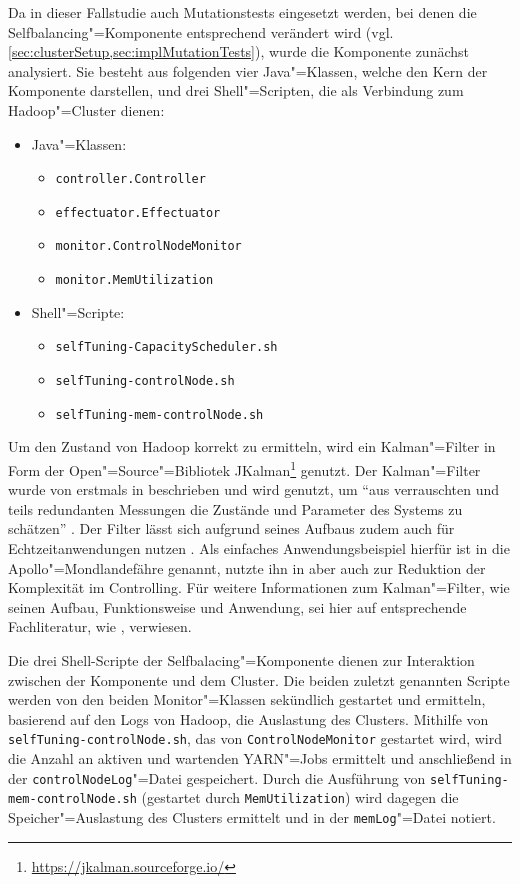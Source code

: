 Da in dieser Fallstudie auch Mutationstests eingesetzt werden, bei denen die Selfbalancing"=Komponente entsprechend verändert wird (vgl. \cref{sec:clusterSetup,sec:implMutationTests}), wurde die Komponente zunächst analysiert.
Sie besteht aus folgenden vier Java"=Klassen, welche den Kern der Komponente darstellen, und drei Shell"=Scripten, die als Verbindung zum Hadoop"=Cluster dienen:

\begin{itemize}
    \item Java"=Klassen:
    \begin{itemize}
        \item \texttt{controller.Controller}
        \item \texttt{effectuator.Effectuator}
        \item \texttt{monitor.ControlNodeMonitor}
        \item \texttt{monitor.MemUtilization}
    \end{itemize}
    \item Shell"=Scripte:
    \begin{itemize}
        \item \texttt{selfTuning-CapacityScheduler.sh}
        \item \texttt{selfTuning-controlNode.sh}
        \item \texttt{selfTuning-mem-controlNode.sh}
    \end{itemize}
\end{itemize}

Um den Zustand von Hadoop korrekt zu ermitteln, wird ein Kalman"=Filter in Form der Open"=Source"=Bibliotek JKalman\footnote{\url{https://jkalman.sourceforge.io/}} genutzt.
Der Kalman"=Filter wurde von \citeauthor{Kalman1960} erstmals in \cite{Kalman1960} beschrieben und wird genutzt, um \enquote{aus verrauschten und teils redundanten Messungen die Zustände und Parameter des Systems zu schätzen} \cite{Marchthaler2017}.
Der Filter lässt sich aufgrund seines Aufbaus zudem auch für Echtzeitanwendungen nutzen \cite{Marchthaler2017}.
Als einfaches Anwendungsbeispiel hierfür ist in \cite{Marchthaler2017} die Apollo"=Mondlandefähre genannt, \citeauthor{Strukov2001} nutzte ihn in \cite{Strukov2001} aber auch zur Reduktion der Komplexität im Controlling.
Für weitere Informationen zum Kalman"=Filter, wie seinen Aufbau, Funktionsweise und Anwendung, sei hier auf entsprechende Fachliteratur, wie \zB \cite{Kim2016,Simon2006,Aggoun2004}, verwiesen.

Die drei Shell-Scripte der Selfbalacing"=Komponente dienen zur Interaktion zwischen der Komponente und dem Cluster.
Die beiden zuletzt genannten Scripte werden von den beiden Monitor"=Klassen sekündlich gestartet und ermitteln, basierend auf den Logs von Hadoop, die Auslastung des Clusters.
Mithilfe von \texttt{selfTuning-controlNode.sh}, das von \texttt{ControlNodeMonitor} gestartet wird, wird die Anzahl an aktiven und wartenden YARN"=Jobs ermittelt und anschließend in der \texttt{controlNodeLog}"=Datei gespeichert.
Durch die Ausführung von \texttt{selfTuning-mem-controlNode.sh} (gestartet durch \texttt{MemUtilization}) wird dagegen die Speicher"=Auslastung des Clusters ermittelt und in der \texttt{memLog}"=Datei notiert.

